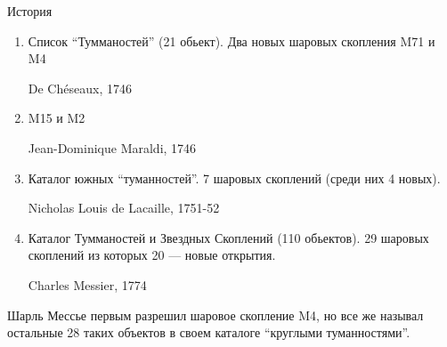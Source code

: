 \documentclass{beamer}
\begin{document}
    \begin{frame}{История}
                    \begin{enumerate}[]
                        \item Список ``Тумманостей'' (21 обьект)\cite{list21}. Два новых шаровых скопления M71 и M4 \par De Chéseaux, 1746
                        \item M15 и M2 \par Jean-Dominique Maraldi, 1746 
                        \item Каталог южных ``туманностей''. 7 шаровых скоплений (среди них 4 новых). \par Nicholas Louis de Lacaille, 1751-52
                        \item Каталог Тумманостей и Звездных Скоплений (110 обьектов). 29 шаровых скоплений из которых 20 --- новые открытия. \par Charles Messier, 1774
                    \end{enumerate}
                    Шарль Мессье первым разрешил шаровое скопление M4, но все же называл остальные 28 таких объектов в своем каталоге ``круглыми туманностями''.
    \end{frame}
\end{document}

